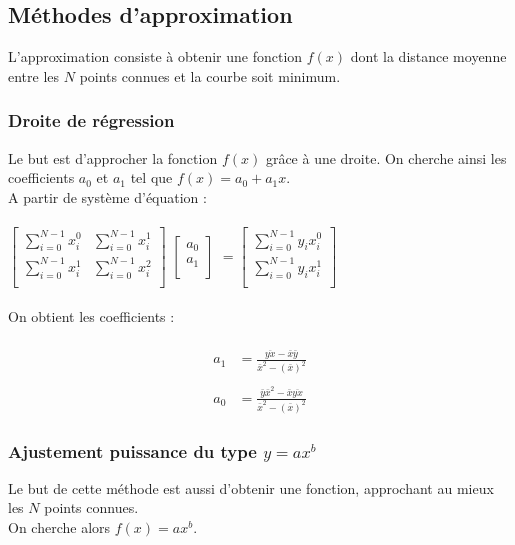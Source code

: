 \documentclass[12pt,french,titlepage]{article}
\begin{document}
	\subsection{Méthodes d'approximation}
	
	L'approximation consiste à obtenir une fonction $f(x)$ dont la distance moyenne entre les $N$ points connues et la courbe soit minimum.\\
	
	\subsubsection{Droite de régression}
	\label{regression}
	Le but est d'approcher la fonction $f(x)$ grâce à une droite. On cherche ainsi les coefficients $a_0$ et $a_1$ tel que $f(x)=a_0+a_1x$.\\
	A partir de système d'équation :\\\\
	$	
		\begin{bmatrix}
		\sum_{i=0}^{N-1}x_i^0&\sum_{i=0}^{N-1}x_i^1\\
		\sum_{i=0}^{N-1}x_i^1&\sum_{i=0}^{N-1}x_i^2\\
		\end{bmatrix}
	$
	$	
		\begin{bmatrix}
		a_0\\a_1\\
		\end{bmatrix}
	$
	$	
		=
		\begin{bmatrix}
		\sum_{i=0}^{N-1}y_ix_i^0\\
		\sum_{i=0}^{N-1}y_ix_i^1\\
		\end{bmatrix}
	$
	\\\\
	On obtient les coefficients :\\\\
	\begin{align*}
		a_1&=\frac{\overline{yx}-\bar{x}\bar{y}}{\bar{x}^2-(\bar{x})^2}\\\\
		a_0&=\frac{\bar{y}\bar{x}^2-\bar{x}\overline{yx}}{\bar{x}^2-(\bar{x})^2}
	\end{align*}
	\subsubsection{Ajustement puissance du type $y = ax^b$}
	
	Le but de cette méthode est aussi d'obtenir une fonction, approchant au mieux les $N$ points connues.\\
	On cherche alors $f(x)=ax^b$.\\
	
\end{document}
